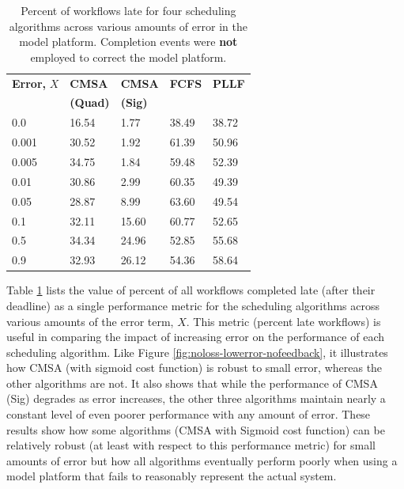\documentclass[10pt]{csce}
\begin{document}
\begin{table}
       \begin{center}
       \begin{tabular}{lllll}
\textbf{Error, }$X$ & \textbf{CMSA}	& \textbf{CMSA}				& \textbf{FCFS}				& \textbf{PLLF} \\
		& \textbf{(Quad)}			& \textbf{(Sig)}			&							& \\
0.0		& \cellcolor{red! 6}16.54	& \cellcolor{green!9}1.77	& \cellcolor{red!28}38.49	& \cellcolor{red!28}38.72 \\
0.001	& \cellcolor{red!20}30.52	& \cellcolor{green!9}1.92	& \cellcolor{red!51}61.39	& \cellcolor{red!40}50.96 \\
0.005	& \cellcolor{red!24}34.75	& \cellcolor{green!9}1.84	& \cellcolor{red!49}59.48	& \cellcolor{red!42}52.39 \\
0.01	& \cellcolor{red!20}30.86	& \cellcolor{green!7}2.99	& \cellcolor{red!50}60.35	& \cellcolor{red!39}49.39 \\
0.05	& \cellcolor{red!18}28.87	& \cellcolor{green!1}8.99	& \cellcolor{red!53}63.60	& \cellcolor{red!39}49.54 \\
0.1		& \cellcolor{red!22}32.11	& \cellcolor{red! 5}15.60	& \cellcolor{red!50}60.77	& \cellcolor{red!42}52.65 \\
0.5		& \cellcolor{red!24}34.34	& \cellcolor{red!14}24.96	& \cellcolor{red!42}52.85	& \cellcolor{red!45}55.68 \\
0.9		& \cellcolor{red!22}32.93	& \cellcolor{red!16}26.12	& \cellcolor{red!44}54.36	& \cellcolor{red!48}58.64 \\
       \end{tabular}
       \caption{Percent of workflows late for four scheduling algorithms
			across various amounts of error in the model platform.  Completion
			events were \textbf{not} employed to correct the model platform.}
       \label{tab:perclate}
       \end{center}
\end{table}

Table \ref{tab:perclate} lists the value of percent of all workflows completed
late (after their deadline) as a single performance metric for the scheduling
algorithms across various amounts of the error term, $X$.  This metric (percent
late workflows) is useful in comparing the impact of increasing error on the
performance of each scheduling algorithm.  Like Figure
\ref{fig:noloss-lowerror-nofeedback}, it illustrates how CMSA (with sigmoid cost
function) is robust to small error, whereas the other algorithms are not.  It
also shows that while the performance of CMSA (Sig) degrades as error increases,
the other three algorithms maintain nearly a constant level of even poorer
performance with any amount of error.  These results show how some algorithms
(CMSA with Sigmoid cost function) can be relatively robust (at least with
respect to this performance metric) for small amounts of error but how all
algorithms eventually perform poorly when using a model platform that fails to
reasonably represent the actual system.
\end{document}
